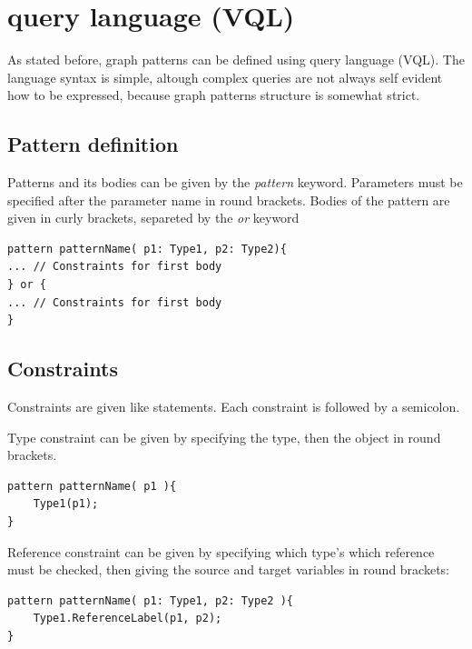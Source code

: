 	

\section{\viatra{} query language (VQL)}

As stated before, graph patterns can be defined using \viatra{} query language (VQL). 
The language syntax is simple, altough complex queries are not always self evident how to be expressed, because graph patterns structure is somewhat strict.

\subsection{Pattern definition}
Patterns and its bodies can be given by the \emph{pattern} keyword. 
Parameters must be specified after the parameter name in round brackets. 
Bodies of the pattern are given in curly brackets, separeted by the \emph{or} keyword

\begin{minipage}{\textwidth}
\begin{lstlisting}[language=vql]
pattern patternName( p1: Type1, p2: Type2){
... // Constraints for first body
} or {
... // Constraints for first body
}
\end{lstlisting}
\end{minipage}


\subsection{Constraints}
Constraints are given like statements. 
Each constraint is followed by a semicolon.

\vspace{\abovedisplayskip}
\begin{minipage}{\textwidth}
Type constraint can be given by specifying the type, then the object in round brackets.
\begin{lstlisting}[language=vql]
pattern patternName( p1 ){
	Type1(p1);
}
\end{lstlisting}
\end{minipage}
\vspace{\belowdisplayskip}

\begin{minipage}{\textwidth}
Reference constraint can be given by specifying which type's which reference must be checked, then giving the source and target variables in round brackets:
\begin{lstlisting}[language=vql]
pattern patternName( p1: Type1, p2: Type2 ){
	Type1.ReferenceLabel(p1, p2);
}
\end{lstlisting}
\end{minipage}
\vspace{\belowdisplayskip}

